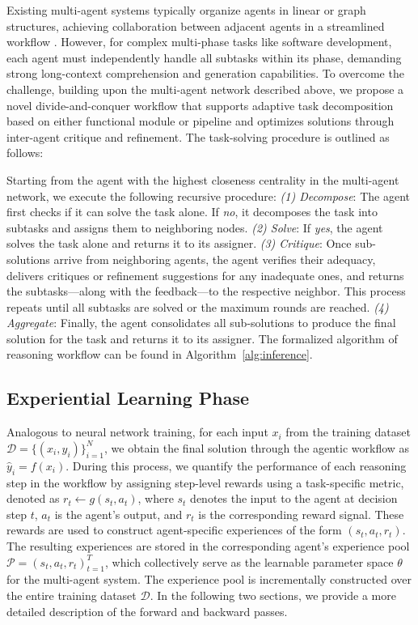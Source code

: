 \documentclass[preprint]{article}
\begin{document}
Existing multi-agent systems typically organize agents in linear or graph structures, achieving collaboration between adjacent agents in a streamlined workflow \citet{qian2023communicative, qian2023experiential}. However, for complex multi-phase tasks like software development, each agent must independently handle all subtasks within its phase, demanding strong long-context comprehension and generation capabilities.
To overcome the challenge, building upon the multi-agent network described above, we propose a novel divide-and-conquer workflow that supports adaptive task decomposition based on either functional module or pipeline and optimizes solutions through inter-agent critique and refinement.
The task-solving procedure is outlined as follows:



Starting from the agent with the highest closeness centrality in the multi-agent network, we execute the following recursive procedure:
    \emph{(1) Decompose}: The agent first checks if it can solve the task alone. 
    If \emph{no}, it decomposes the task into subtasks and assigns them to neighboring nodes. 
    \emph{(2) Solve}: If \emph{yes}, the agent solves the task alone and returns it to its assigner. 
    \emph{(3) Critique}: Once sub-solutions arrive from neighboring agents, the agent verifies their adequacy, delivers critiques or refinement suggestions for any inadequate ones, and returns the subtasks—along with the feedback—to the respective neighbor. 
    This process repeats until all subtasks are solved or the maximum rounds are reached.
    \emph{(4) Aggregate}: Finally, the agent consolidates all sub-solutions to produce the final solution for the task and returns it to its assigner. 
    The formalized algorithm of reasoning workflow can be found in Algorithm~\ref{alg:inference}.



\subsection{Experiential Learning Phase}
\label{sec:training}
Analogous to neural network training, for each input $x_i$ from the training dataset $\mathcal{D}=\{(x_i, y_i)\}_{i=1}^{N}$, we obtain the final solution through the agentic workflow as $\hat{y}_i = f(x_i)$.  
During this process, we quantify the performance of each reasoning step in the workflow by assigning step-level rewards using a task-specific metric, denoted as $r_t \leftarrow g(s_t, a_t)$, where $s_t$ denotes the input to the agent at decision step $t$, $a_t$ is the agent's output, and $r_t$ is the corresponding reward signal. 
These rewards are used to construct agent-specific experiences of the form $(s_t, a_t, r_t)$. 
The resulting experiences are stored in the corresponding agent's experience pool $\mathcal{P} = {(s_t, a_t, r_t)}_{t=1}^{T}$, which collectively serve as the learnable parameter space $\theta$ for the multi-agent system.  
The experience pool is incrementally constructed over the entire training dataset $\mathcal{D}$. In the following two sections, we provide a more detailed description of the forward and backward passes.
\end{document}
